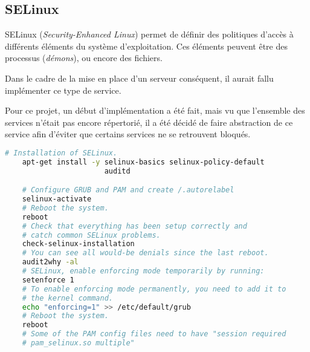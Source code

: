 \subsection{SELinux}
\label{subsec:selinux}

SELinux (\emph{Security-Enhanced Linux}) permet de définir des politiques
d'accès à différents éléments du système d'exploitation. Ces éléments peuvent
être des processus (\emph{démons}), ou encore des fichiers.

Dans le cadre de la mise en place d'un serveur conséquent, il aurait fallu
implémenter ce type de service.

Pour ce projet, un début d'implémentation a été fait, mais vu que l'ensemble des
services n'était pas encore répertorié, il a été décidé de faire abstraction de
ce service afin d'éviter que certains services ne se retrouvent bloqués.

  \begin{lstlisting}[language=bash]
    # Installation of SELinux.
    apt-get install -y selinux-basics selinux-policy-default
                       auditd

    # Configure GRUB and PAM and create /.autorelabel
    selinux-activate
    # Reboot the system.
    reboot
    # Check that everything has been setup correctly and
    # catch common SELinux problems.
    check-selinux-installation
    # You can see all would-be denials since the last reboot.
    audit2why -al
    # SELinux, enable enforcing mode temporarily by running:
    setenforce 1
    # To enable enforcing mode permanently, you need to add it to
    # the kernel command.
    echo "enforcing=1" >> /etc/default/grub
    # Reboot the system.
    reboot
    # Some of the PAM config files need to have "session required
    # pam_selinux.so multiple"
  \end{lstlisting}

